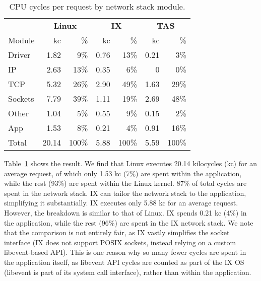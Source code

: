 \begin{table}[t]
\centering
\begin{tabular}{l@{\hskip 4ex}rr@{\hskip 4ex}rr@{\hskip 4ex}rr}
  & \multicolumn{2}{c}{\textbf{Linux}} & \multicolumn{2}{c}{\textbf{IX}} & \multicolumn{2}{c}{\textbf{TAS}}\\
  Module & kc & \% & kc & \% & kc & \%\\
  \midrule
  Driver    &  1.82 &   9\% & 0.76 &   13\% & 0.21 &  3\% \\
  IP        &  2.63 &  13\% & 0.35 &    6\% &    0 &  0\% \\
  TCP       &  5.32 &  26\% & 2.90 &   49\% & 1.63 & 29\% \\
  Sockets   &  7.79 &  39\% & 1.11 &   19\% & 2.69 & 48\% \\
  Other     &  1.04 &   5\% & 0.55 &    9\% & 0.15 &  2\% \\
  App       &  1.53 &   8\% & 0.21 &    4\% & 0.91 & 16\% \\
  \midrule
  Total     & 20.14 & 100\% & 5.88 &  100\% & 5.59 & 100\%\\
\end{tabular}
\caption{CPU cycles per request by network stack module.}
\label{tab:cycles_breakdown}
\end{table}

Table~\ref{tab:cycles_breakdown} shows the result. We find that Linux
executes 20.14 kilocycles (kc) for an average request, of which only
1.53 kc (7\%) are spent within the application, while the rest (93\%)
are spent within the Linux kernel. 87\% of total cycles are spent in
the network stack. IX can tailor the network stack to the application,
simplifying it substantially. IX executes only 5.88 kc for an average
request. However, the breakdown is similar to that of Linux. IX spends
0.21 kc (4\%) in the application, while the rest (96\%) are spent in
the IX network stack. We note that the comparison is not entirely
fair, as IX vastly simplifies the socket interface (IX does not
support POSIX sockets, instead relying on a custom libevent-based
API). This is one reason why so many fewer cycles are spent in the
application itself, as libevent API cycles are counted as part of the
IX OS (libevent is part of its system call interface), rather than
within the application.

